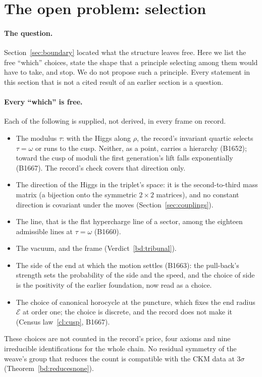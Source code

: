 \section{The open problem: selection}\label{sec:selection}

\paragraph{The question.}
Section~\ref{sec:boundary} located what the structure leaves free. Here we list the free ``which'' choices, state the
shape that a principle selecting among them would have to take, and stop. We do not propose such a principle. Every
statement in this section that is not a cited result of an earlier section is a question.

\paragraph{Every ``which'' is free.} Each of the following is supplied, not derived, in every frame on record.
\begin{itemize}
\item The modulus $\tau$: with the Higgs along $\rho$, the record's invariant quartic selects $\tau=\omega$ or runs to the
  cusp. Neither, as a point, carries a hierarchy (B1652); toward the cusp of moduli the first generation's lift falls
  exponentially (B1667). The record's check covers that direction only.
\item The direction of the Higgs in the triplet's space: it is the second-to-third mass matrix (a bijection onto the
  symmetric $2\times2$ matrices), and no constant direction is covariant under the moves (Section~\ref{sec:couplings}).
\item The line, that is the flat hypercharge line of a sector, among the eighteen admissible lines at $\tau=\omega$
  (B1660).
\item The vacuum, and the frame (Verdict~\ref{bd:tribunal}).
\item The side of the end at which the motion settles (B1663): the pull-back's strength sets the probability of the side and the speed, and
  the choice of side is the positivity of the earlier foundation, now read as a choice.
\item The choice of canonical horocycle at the puncture, which fixes the end radius $\mathcal E$ at order one; the choice is
  discrete, and the record does not make it (Census law~\ref{cl:cusp}, B1667).
\end{itemize}
These choices are not counted in the record's price, four axioms and nine irreducible identifications for the whole
chain. No residual symmetry of the weave's group that reduces the count is compatible with the CKM data at $3\sigma$
(Theorem~\ref{bd:reducesnone}).


